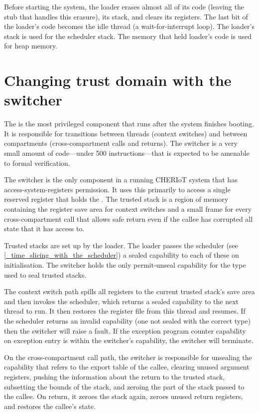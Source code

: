 Before starting the system, the loader erases almost all of its code (leaving the stub that handles this erasure), its stack, and clears its registers.
The last bit of the loader's code becomes the idle thread (a wait-for-interrupt loop).
The loader's stack is used for the scheduler stack.
The memory that held loader's code is used for heap memory.

\section{Changing trust domain with the switcher}

The  is the most privileged component that runs after the system finishes booting.
It is responsible for transitions between threads (context switches) and between compartments (cross-compartment calls and returns).
The switcher is a very small amount of code—under 500 instructions—that is expected to be amenable to formal verification.

The switcher is the only component in a running CHERIoT system that has access-system-registers permission.
It uses this primarily to access a single reserved register that holds the .
The trusted stack is a region of memory containing the register save area for context switches and a small frame for every cross-compartment call that allows safe return even if the callee has corrupted all state that it has access to.

Trusted stacks are set up by the loader.
The loader passes the scheduler (see \ref{_time_slicing_with_the_scheduler}) a sealed capability to each of these on initialisation.
The switcher holds the only permit-unseal capability for the type used to seal trusted stacks.

The context switch path spills all registers to the current trusted stack's save area and then invokes the scheduler, which returns a sealed capability to the next thread to run.
It then restores the register file from this thread and resumes.
If the scheduler returns an invalid capability (one not sealed with the correct type) then the switcher will raise a fault.
If the exception program counter capability on exception entry is within the switcher's capability, the switcher will terminate.

On the cross-compartment call path, the switcher is responsible for unsealing the capability that refers to the export table of the callee, clearing unused argument registers, pushing the information about the return to the trusted stack, subsetting the bounds of the stack, and zeroing the part of the stack passed to the callee.
On return, it zeroes the stack again, zeroes unused return registers, and restores the callee's state.

